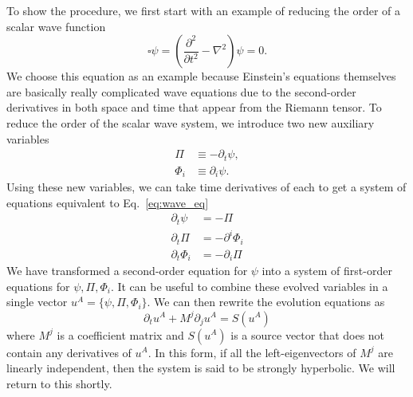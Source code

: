 \begin{bibunit}[unsrtnat]
To show the procedure, we first start with an example of reducing the order of a
scalar wave function
\begin{equation}\label{eq:wave_eq}
   \square\psi = \left(\frac{\partial^2}{\partial t^2} - \nabla^2\right)\psi=0.
\end{equation}
We choose this equation as an example because Einstein's equations themselves
are basically really complicated wave equations due to the second-order
derivatives in both space and time that appear from the Riemann tensor. To
reduce the order of the scalar wave system, we introduce two new auxiliary
variables
\begin{align}
   \Pi &\equiv -\partial_t\psi, \label{eq:sw_pi_def}\\
   \Phi_i &\equiv \partial_i\psi \label{eq:sw_phi_def}.
\end{align}
Using these new variables, we can take time derivatives of each to get a system
of equations equivalent to Eq.~\ref{eq:wave_eq}
\begin{align}
   \partial_t\psi &= -\Pi \\
   \partial_t\Pi &= -\partial^i\Phi_i \\
   \partial_t\Phi_i &= -\partial_i\Pi
\end{align}
We have transformed a second-order equation for $\psi$ into a system of
first-order equations for $\psi,\Pi,\Phi_i$. It can be useful to combine these evolved
variables in a single vector $u^A=\{\psi,\Pi,\Phi_i\}$. We can then rewrite the
evolution equations as
\begin{equation}
   \partial_t u^A + M^j\partial_j u^A = S(u^A)
\end{equation}
where $M^j$ is a coefficient matrix and $S(u^A)$ is a source vector that does
not contain any derivatives of $u^A$. In this form, if all the left-eigenvectors
of $M^j$ are linearly independent, then the system is said to be strongly
hyperbolic. We will return to this shortly.


\end{bibunit}
